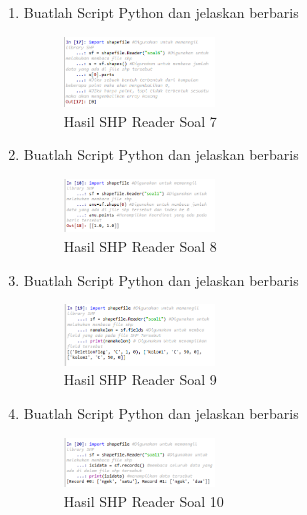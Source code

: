 \begin{enumerate}
    \item Buatlah Script Python dan jelaskan berbaris
    
    \hfill\break
    \begin{figure}[H]
		\includegraphics[width=4cm]{figures/1174096/3/soal7.png}
		\centering
		\caption{Hasil SHP Reader Soal 7}
    \end{figure}

    \item Buatlah Script Python dan jelaskan berbaris
    
    \hfill\break
    \begin{figure}[H]
		\includegraphics[width=4cm]{figures/1174096/3/soal8.png}
		\centering
		\caption{Hasil SHP Reader Soal 8}
    \end{figure}

    \item Buatlah Script Python dan jelaskan berbaris
    
    \hfill\break
    \begin{figure}[H]
		\includegraphics[width=4cm]{figures/1174096/3/soal9.png}
		\centering
		\caption{Hasil SHP Reader Soal 9}
    \end{figure}

    \item Buatlah Script Python dan jelaskan berbaris
    
    \hfill\break
    \begin{figure}[H]
		\includegraphics[width=4cm]{figures/1174096/3/soal10.png}
		\centering
		\caption{Hasil SHP Reader Soal 10}
    \end{figure}


\end{enumerate}
